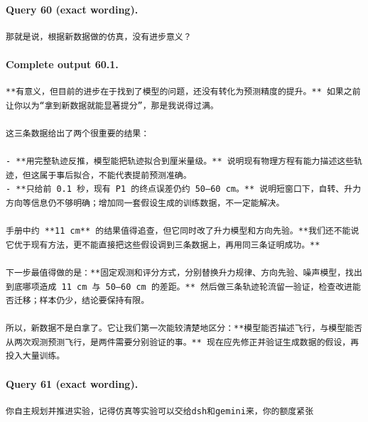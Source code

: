 \documentclass[UTF8,10pt]{ctexart}
\begin{document}
\paragraph{Query 60 (exact wording).}
\begin{Verbatim}[breaklines=true,breakanywhere=true,fontsize=\scriptsize,frame=single,framesep=2pt]
那就是说，根据新数据做的仿真，没有进步意义？
\end{Verbatim}

\paragraph{Complete output 60.1.}
\begin{Verbatim}[breaklines=true,breakanywhere=true,fontsize=\scriptsize,frame=single,framesep=2pt]
**有意义，但目前的进步在于找到了模型的问题，还没有转化为预测精度的提升。** 如果之前让你以为“拿到新数据就能显著提分”，那是我说得过满。

这三条数据给出了两个很重要的结果：

- **用完整轨迹反推，模型能把轨迹拟合到厘米量级。** 说明现有物理方程有能力描述这些轨迹，但这属于事后拟合，不能代表提前预测准确。
- **只给前 0.1 秒，现有 P1 的终点误差仍约 50–60 cm。** 说明短窗口下，自转、升力方向等信息仍不够明确；增加同一套假设生成的训练数据，不一定能解决。

手册中约 **11 cm** 的结果值得追查，但它同时改了升力模型和方向先验。**我们还不能说它优于现有方法，更不能直接把这些假设调到三条数据上，再用同三条证明成功。**

下一步最值得做的是：**固定观测和评分方式，分别替换升力规律、方向先验、噪声模型，找出到底哪项造成 11 cm 与 50–60 cm 的差距。** 然后做三条轨迹轮流留一验证，检查改进能否迁移；样本仍少，结论要保持有限。

所以，新数据不是白拿了。它让我们第一次能较清楚地区分：**模型能否描述飞行，与模型能否从两次观测预测飞行，是两件需要分别验证的事。** 现在应先修正并验证生成数据的假设，再投入大量训练。
\end{Verbatim}

\paragraph{Query 61 (exact wording).}
\begin{Verbatim}[breaklines=true,breakanywhere=true,fontsize=\scriptsize,frame=single,framesep=2pt]
你自主规划并推进实验，记得仿真等实验可以交给dsh和gemini来，你的额度紧张
\end{Verbatim}
\end{document}
